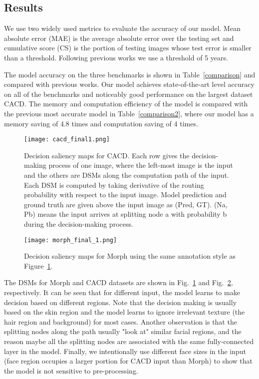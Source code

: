 \documentclass{bmvc2k}
\begin{document}
\subsection{Results}
We use two widely used metrics to evaluate the accuracy of our model. Mean absolute error (MAE) is the average absolute error over the testing set and cumulative score (CS) is the portion of testing images whose test error is smaller than a threshold. Following previous works\cite{OHRank, DRFs} we use a threshold of 5 years. 

The model accuracy on the three benchmarks is shown in Table~\ref{comparison} and compared with previous works. Our model achieves state-of-the-art level accuracy on all of the benchmarks and noticeably good performance on the largest dataset CACD. The memory and computation efficiency of the model is compared with the previous most accurate model\cite{DRFs} in Table~\ref{comparison2}, where our model has a memory saving of 4.8 times and computation saving of 4 times.

\begin{figure}
	\centering

	\begin{center}
		\texttt{[image: cacd\_final1.png]}
	\end{center}

	\caption{Decision saliency maps for CACD. Each row gives the decision-making process of one image, where the left-most image is the input and the others are DSMs along the computation path of the input. Each DSM is computed by taking derivative of the routing probability  with respect to the input image. Model prediction and ground truth are given above the input image as (Pred, GT). (Na, Pb) means the input arrives at splitting node a with probability b during the decision-making process.}
	\label{results_CACD}
\end{figure}

\begin{figure}
	\begin{center}
	\begin{center}
		\texttt{[image: morph\_final\_1.png]}
	\end{center}
	\end{center}
	\caption{Decision saliency maps for Morph using the same annotation style as Figure~\ref{results_CACD}.}
	\label{results_morph}
\end{figure}

The DSMs for Morph and CACD datasets are shown in Fig.~\ref{results_CACD} and Fig.~\ref{results_morph}, respectively. It can be seen that for different input, the model learns to make decision based on different regions. Note that the decision making is usually based on the skin region and the model learns to ignore irrelevant texture (the hair region and background) for most cases. Another observation is that the splitting nodes along the path usually "look at" similar facial regions, and the reason maybe all the splitting nodes are associated with the same fully-connected layer in the model. Finally, we intentionally use different face sizes in the input (face region occupies a larger portion for CACD input than Morph) to show that the model is not sensitive to pre-processing. 
\end{document}
